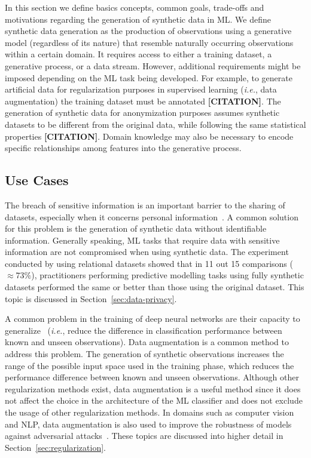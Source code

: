 \documentclass[parskip=full]{scrartcl}
\begin{document}
In this section we define basics concepts, common goals, trade-offs and
motivations regarding the generation of synthetic data in ML\@. We define
synthetic data generation as the production of observations using a generative
model (regardless of its nature) that resemble naturally occurring
observations within a certain domain. It requires access to either a training
dataset, a generative process, or a data stream. However, additional
requirements might be imposed depending on the ML task being developed. For
example, to generate artificial data for regularization purposes in supervised
learning (\textit{i.e.}, data augmentation) the training dataset must be
annotated \textbf{[CITATION]}. The generation of synthetic data for
anonymization purposes assumes synthetic datasets to be different from the
original data, while following the same statistical properties
\textbf{[CITATION]}. Domain knowledge may also be necessary to encode specific
relationships among features into the generative process.


\subsection{Use Cases}

The breach of sensitive information is an important barrier to the sharing of
datasets, especially when it concerns personal
information~\cite{dankar2021fake}. A common solution for this problem is the
generation of synthetic data without identifiable information. Generally
speaking, ML tasks that require data with sensitive information are not
compromised when using synthetic data. The experiment conducted by
\citet{patki2016synthetic} using relational datasets showed that in 11 out 15
comparisons ($\approx 73\%$), practitioners performing predictive modelling
tasks using fully synthetic datasets performed the same or better than those
using the original dataset. This topic is discussed in
Section~\ref{sec:data-privacy}.

A common problem in the training of deep neural networks are their capacity to
generalize~\cite{Zhang2021} (\textit{i.e.}, reduce the difference in
classification performance between known and unseen observations). Data
augmentation is a common method to address this problem. The generation of
synthetic observations increases the range of the possible input space used in
the training phase, which reduces the performance difference between known and
unseen observations. Although other regularization methods exist, data
augmentation is a useful method since it does not affect the choice in the
architecture of the ML classifier and does not exclude the usage of other
regularization methods. In domains such as computer vision and NLP, data
augmentation is also used to improve the robustness of models against
adversarial attacks~\cite{zeng2020data, morris2020textattack}. These topics
are discussed into higher detail in Section~\ref{sec:regularization}.
\end{document}
